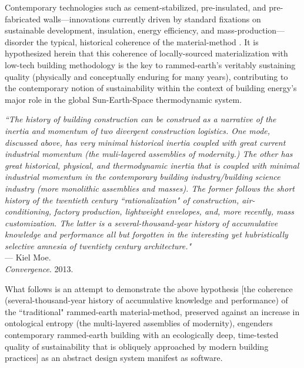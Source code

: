 Contemporary technologies such as cement-stabilized, pre-insulated, and pre-fabricated walls---innovations currently driven by standard fixations on sustainable development, insulation, energy efficiency, and mass-production---disorder the typical, historical coherence of the material-method \cite{MOECONVERGENCE}. It is hypothesized herein that this coherence of locally-sourced materialization with low-tech building methodology is the key to rammed-earth's veritably sustaining quality (physically and conceptually enduring for many years), contributing to the contemporary notion of sustainability within the context of building energy's major role in the global Sun-Earth-Space thermodynamic system.

\begin{flushright}
  \small{
  \textit{``The history of building construction can be construed as a narrative of the inertia and momentum of two divergent construction logistics. One mode, discussed above, has very minimal historical inertia coupled with great current industrial momentum (the muli-layered assemblies of modernity.) The other has great historical, physical, and thermodynamic inertia that is coupled with minimal industrial momentum in the contemporary building industry/building science industry (more monolithic assemblies and masses). The former follows the short history of the twentieth century ``rationalization" of construction, air-conditioning, factory production, lightweight envelopes, and, more recently, mass customization. The latter is a several-thousand-year history of accumulative knowledge and performance all but forgotten in the interesting yet hubristically selective amnesia of twentiety century architecture."}}\\ --- Kiel Moe. \\ \textit{Convergence}. 2013.
\end{flushright}

\clearpage

What follows is an attempt to demonstrate the above hypothesis [the coherence (several-thousand-year history of accumulative knowledge and performance) of the ``traditional" rammed-earth material-method, preserved against an increase in ontological entropy (the multi-layered assemblies of modernity), engenders contemporary rammed-earth building with an ecologically deep, time-tested quality of sustainability that is obliquely approached by modern building practices] as an abstract design system manifest as software. 
